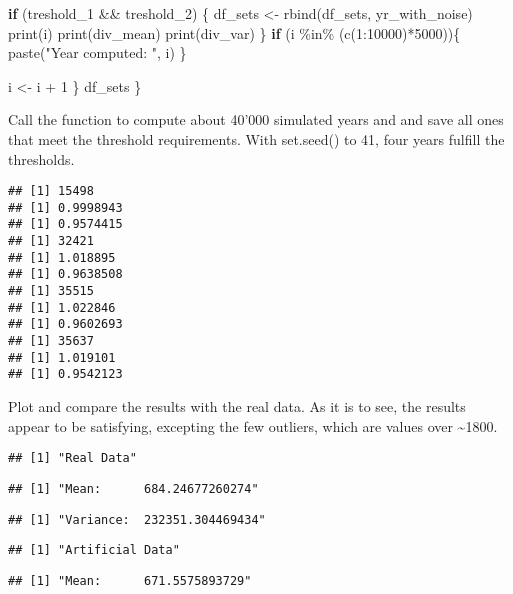 \documentclass[
]{article}
\newenvironment{Shaded}{\begin{snugshade}}{\end{snugshade}}
\newcommand{\ControlFlowTok}[1]{\textcolor[rgb]{0.13,0.29,0.53}{\textbf{#1}}}
\newcommand{\DecValTok}[1]{\textcolor[rgb]{0.00,0.00,0.81}{#1}}
\newcommand{\FunctionTok}[1]{\textcolor[rgb]{0.00,0.00,0.00}{#1}}
\newcommand{\NormalTok}[1]{#1}
\newcommand{\OtherTok}[1]{\textcolor[rgb]{0.56,0.35,0.01}{#1}}
\newcommand{\SpecialCharTok}[1]{\textcolor[rgb]{0.00,0.00,0.00}{#1}}
\newcommand{\StringTok}[1]{\textcolor[rgb]{0.31,0.60,0.02}{#1}}
\begin{document}
\begin{Shaded}
\begin{Highlighting}[]
    \ControlFlowTok{if}\NormalTok{ (treshold\_1 }\SpecialCharTok{\&\&}\NormalTok{ treshold\_2) \{}
\NormalTok{      df\_sets }\OtherTok{\textless{}{-}} \FunctionTok{rbind}\NormalTok{(df\_sets, yr\_with\_noise)}
      \FunctionTok{print}\NormalTok{(i)}
      \FunctionTok{print}\NormalTok{(div\_mean)}
      \FunctionTok{print}\NormalTok{(div\_var)}
\NormalTok{    \}}
    \ControlFlowTok{if}\NormalTok{ (i }\SpecialCharTok{\%in\%}\NormalTok{ (}\FunctionTok{c}\NormalTok{(}\DecValTok{1}\SpecialCharTok{:}\DecValTok{10000}\NormalTok{)}\SpecialCharTok{*}\DecValTok{5000}\NormalTok{))\{}
      \FunctionTok{paste}\NormalTok{(}\StringTok{"Year computed: "}\NormalTok{, i)}
\NormalTok{    \}}
    
\NormalTok{    i }\OtherTok{\textless{}{-}}\NormalTok{ i }\SpecialCharTok{+} \DecValTok{1}
\NormalTok{  \}}
\NormalTok{  df\_sets}
\NormalTok{\}}
\end{Highlighting}
\end{Shaded}

Call the function to compute about 40'000 simulated years and and save
all ones that meet the threshold requirements. With set.seed() to 41,
four years fulfill the thresholds.

\begin{verbatim}
## [1] 15498
## [1] 0.9998943
## [1] 0.9574415
## [1] 32421
## [1] 1.018895
## [1] 0.9638508
## [1] 35515
## [1] 1.022846
## [1] 0.9602693
## [1] 35637
## [1] 1.019101
## [1] 0.9542123
\end{verbatim}

Plot and compare the results with the real data. As it is to see, the
results appear to be satisfying, excepting the few outliers, which are
values over \textasciitilde1800.

\begin{verbatim}
## [1] "Real Data"
\end{verbatim}

\begin{verbatim}
## [1] "Mean:      684.24677260274"
\end{verbatim}

\begin{verbatim}
## [1] "Variance:  232351.304469434"
\end{verbatim}

\begin{verbatim}
## [1] "Artificial Data"
\end{verbatim}

\begin{verbatim}
## [1] "Mean:      671.5575893729"
\end{verbatim}
\end{document}
